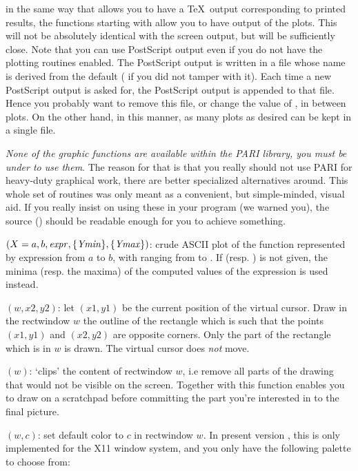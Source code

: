  in the same way that  allows you to have a \TeX\ output
corresponding to printed results, the functions starting with  allow
you to have  output of the plots. This will not be absolutely
identical with the screen output, but will be sufficiently close. Note that
you can use PostScript output even if you do not have the plotting routines
enabled. The PostScript output is written in a file whose name is derived from
the  default ( if you did not tamper with it). Each
time a new PostScript output is asked for, the PostScript output is appended
to that file. Hence you probably want to remove this file, or change the value
of , in between plots. On the other hand, in this manner, as many
plots as desired can be kept in a single file. \smallskip

 \emph{None of the graphic functions are available
within the PARI library, you must be under  to use them}. The reason
for that is that you really should not use PARI for heavy-duty graphical work,
there are better specialized alternatives around. This whole set of routines
was only meant as a convenient, but simple-minded, visual aid. If you really
insist on using these in your program (we warned you), the source
() should be readable enough for you to achieve something.

$(X=a,b,\hbox{\it expr\/},\{\hbox{\it Ymin\/}\},\{\hbox{\it Ymax\/}\})$: crude
ASCII plot of the function represented by expression  from
$a$ to $b$, with  ranging from  to . If
 (resp. ) is not given, the minima (resp. the
maxima) of the computed values of the expression is used instead.

$(w,x2,y2)$: let $(x1,y1)$ be the current position of the
virtual cursor. Draw in the rectwindow $w$ the outline of the rectangle which
is such that the points $(x1,y1)$ and $(x2,y2)$ are opposite corners. Only
the part of the rectangle which is in $w$ is drawn. The virtual cursor does
\emph{not} move.

$(w)$: `clips' the content of rectwindow $w$, i.e
remove all parts of the drawing that would not be visible on the screen.
Together with  this function enables you to draw on a
scratchpad before committing the part you're interested in to the final
picture.

$(w,c)$: set default color to $c$ in rectwindow $w$.
In present version \vers, this is only implemented for the X11 window system,
and you only have the following palette to choose from:


